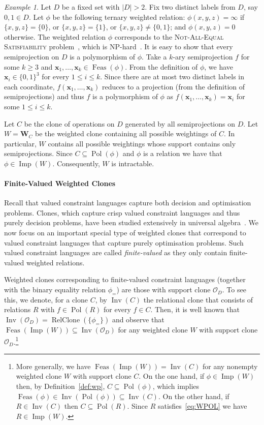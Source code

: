 \documentclass[11pt, reqno]{article}
\newcommand{\tup}[1]{\ensuremath{\mathbf #1}}
\DeclareMathOperator{\feas}{Feas}
\DeclareMathOperator{\imp}{Imp}
\DeclareMathOperator{\inv}{Inv}
\DeclareMathOperator{\pol}{Pol}
\DeclareMathOperator{\relclone}{RelClone}
\theoremstyle{remark}
\newtheorem{example}{Example}
\begin{document}
\begin{example}
Let $D$ be a fixed set with $|D|>2$. 
Fix two distinct labels from $D$, say $0,1\in D$.
Let $\phi$ be the following ternary weighted relation: $\phi(x,y,z)=\infty$ if
$\{x,y,z\}=\{0\}$, or $\{x,y,z\}=\{1\}$, or $\{x,y,z\}\neq\{0,1\}$; and
$\phi(x,y,z)=0$ otherwise. The weighted relation $\phi$ corresponds to the
\textsc{Not-All-Equal Satisfiability} problem~\cite{Garey79:intractability},
which is NP-hard~\cite{Schaefer78:complexity}. It is easy to show that every
semiprojection on $D$ is a polymorphism of $\phi$.
Take a $k$-ary semiprojection $f$ for some $k\geq 3$ and
$\tup{x}_1,\ldots,\tup{x}_k\in\feas(\phi)$. From the definition of $\phi$, 
we have $\tup{x}_i\in\{0,1\}^3$ for every
$1\leq i\leq k$. Since there are at most two distinct labels in each 
coordinate, $f(\tup{x}_1,\ldots,\tup{x}_k)$ reduces to a projection (from the
definition of semiprojections) and thus $f$ is a polymorphism of $\phi$ as
$f(\tup{x}_1,\ldots,\tup{x}_k)=\tup{x}_i$ for some $1\leq i\leq k$.

Let $C$ be the clone of operations on $D$ generated by all semiprojections on
$D$. Let $W=\mathbf{W}_C$ be the weighted
clone containing all possible weightings of $C$. In particular, $W$ contains all
possible weightings whose support contains only semiprojections. Since
$C\subseteq\pol(\phi)$ and $\phi$ is a relation we have that $\phi\in\imp(W)$.
Consequently, $W$ is intractable.
\end{example}

\paragraph{Finite-Valued Weighted Clones}

Recall that valued constraint languages capture both decision and optimisation
problems. Clones, which capture crisp valued constraint languages and thus
purely decision problems, have been studied extensively in universal
algebra~\cite{Szendrei86:clones,Hobby88:structure}. We now focus on an important
special type of weighted clones that correspond to valued constraint languages
that capture purely optimisation problems. Such valued constraint languages are
called \emph{finite-valued} as they only contain finite-valued weighted
relations.

Weighted clones corresponding to finite-valued constraint languages (together
with the binary equality relation $\phi_=$) are those 
with support clone $\mathcal{O}_D$. To see this,
we denote, for a clone $C$, by $\inv(C)$ the relational clone that consists of relations $R$ with $f\in\pol(R)$ for every $f\in C$.
Then, it is well known that
$\inv(\mathcal{O}_D)=\relclone(\{\phi_=\})$ and observe that
$\feas(\imp(W))\subseteq\inv(\mathcal{O}_D)$ for any weighted clone $W$ with
support clone $\mathcal{O}_D$.\footnote{More generally, we have
$\feas(\imp(W))=\inv(C)$ for any nonempty weighted clone $W$ with support clone
$C$. On the one hand, if $\phi\in\imp(W)$ then, by Definition~\ref{def:wp},
$C\subseteq\pol(\phi)$, which implies
$\feas(\phi)\in\inv(\pol(\phi))\subseteq\inv(C)$. On the other hand, if
$R\in\inv(C)$ then $C\subseteq\pol(R)$. Since $R$ satisfies~\eqref{eq:WPOL} we
have $R\in\imp(W)$.}
\end{document}
